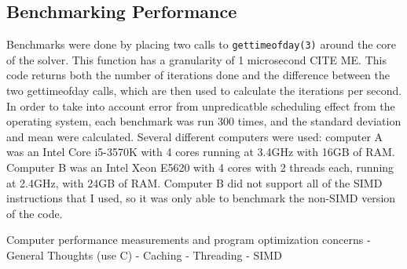 \subsection{Benchmarking Performance}
Benchmarks were done by placing two calls to \texttt{gettimeofday(3)} around the core of the solver. This function has a
granularity of 1 microsecond CITE ME. This code returns
both the number of iterations done and the difference between the two gettimeofday calls, which are then used to calculate
the iterations per second. In order to take into account error from unpredicatble scheduling effect from the operating system,
each benchmark was run 300 times, and the standard deviation and mean were calculated. Several different computers were used:
computer A was an Intel Core i5-3570K with 4 cores running at 3.4GHz with 16GB of RAM. Computer B was an Intel Xeon E5620
with 4 cores with 2 threads each, running at 2.4GHz, with 24GB of RAM. Computer B did not support all of the SIMD instructions
that I used, so it was only able to benchmark the non-SIMD version of the code.

Computer performance measurements and program optimization concerns
 - General Thoughts (use C)
 - Caching
 - Threading
 - SIMD


